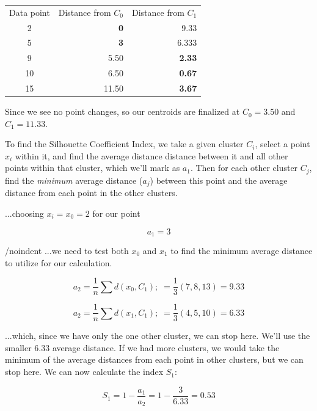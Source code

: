 \documentclass{article}
\begin{document}
\begin{center}
    \begin{tabular}{c r r}
        Data point & Distance from $C_0$ & Distance from $C_1$\\
        2 & \textbf{0} & 9.33 \\
        5 & \textbf{3} & 6.333 \\
        9 & 5.50 & \textbf{2.33} \\
        10 & 6.50 & \textbf{0.67} \\
        15 & 11.50 & \textbf{3.67} \\
    \end{tabular}
\end{center}

\noindent Since we see no point changes, so our centroids are finalized at $C_0=3.50$ and $C_1=11.33$.

To find the Silhouette Coefficient Index, we take a given cluster $C_i$, select a point $x_i$ within it, and find the average distance distance between it and all other points within that cluster, which we'll mark as $a_1$. Then for each other cluster $C_j$, find the \textit{minimum} average distance ($a_j$) between this point and the average distance from each point in the other clusters.

\noindent ...choosing $x_i=x_0=2$ for our point

\begin{equation}
    a_1 = 3
\end{equation}

/noindent ...we need to test both $x_0$ and $x_1$ to find the minimum average distance to utilize for our calculation.

\begin{equation}
    a_2 = \frac{1}{n} \sum d(x_0, C_1); \; = \frac{1}{3} (7, 8, 13) = 9.33
\end{equation}

\begin{equation}
    a_2 = \frac{1}{n} \sum d(x_1, C_1); \; = \frac{1}{3} (4, 5, 10) = 6.33
\end{equation}


\noindent ...which, since we have only the one other cluster, we can stop here. We'll use the smaller $6.33$ average distance. If we had more clusters, we would take the minimum of the average distances from each point in other clusters, but we can stop here. We can now calculate the index $S_1$:

\begin{equation}
    S_1 = 1 - \frac{a_1}{a_2} = 1 - \frac{3}{6.33} = 0.53
\end{equation}
\end{document}
